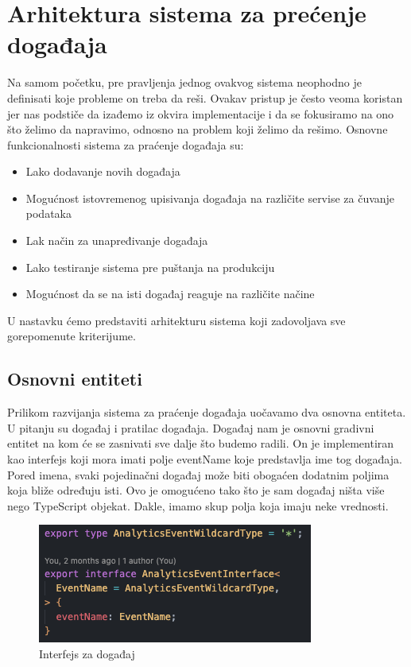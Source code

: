 \documentclass[12pt,oneside]{memoir}
\begin{document}
\section{Arhitektura sistema za prećenje događaja}

Na samom početku, pre pravljenja jednog ovakvog sistema neophodno je definisati koje probleme on treba da reši. Ovakav pristup je često veoma koristan jer nas podstiče da izađemo iz okvira implementacije i da se fokusiramo na ono što želimo da napravimo, odnosno na problem koji želimo da rešimo.
\newline
\newline
Osnovne funkcionalnosti sistema za praćenje događaja su:
\begin{itemize}
\item Lako dodavanje novih događaja
\item Mogućnost istovremenog upisivanja događaja na različite servise za čuvanje podataka
\item Lak način za unapređivanje događaja
\item Lako testiranje sistema pre puštanja na produkciju
\item Mogućnost da se na isti događaj reaguje na različite načine 
\end{itemize}

U nastavku ćemo predstaviti arhitekturu sistema koji zadovoljava sve gorepomenute kriterijume.

\subsection{Osnovni entiteti}

Prilikom razvijanja sistema za praćenje događaja uočavamo dva osnovna entiteta. U pitanju su događaj i pratilac događaja. Događaj nam je osnovni gradivni entitet na kom će se zasnivati sve dalje što budemo radili. On je implementiran kao interfejs koji mora imati polje eventName koje predstavlja ime tog događaja. Pored imena, svaki pojedinačni događaj može biti obogaćen dodatnim poljima koja bliže određuju isti. Ovo je omogućeno tako što je sam događaj ništa više nego TypeScript objekat. Dakle, imamo skup polja koja imaju neke vrednosti. 

\begin{figure}[h!]
\centering
\includegraphics[scale=0.5]{docs/images/chapterSix/eventInterface.png}
\caption{Interfejs za događaj}
\label{fig:eventInterface}
\end{figure}
\end{document}
